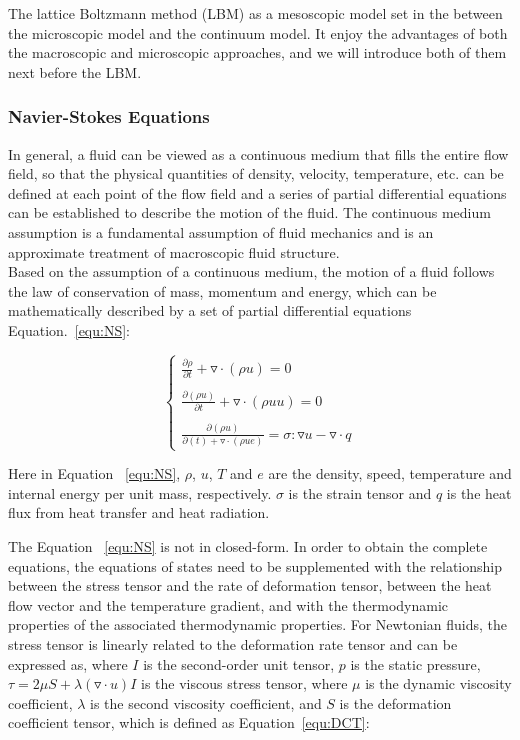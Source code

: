 The lattice Boltzmann method (LBM) as a mesoscopic model set in the between the microscopic model and the continuum model. It enjoy the advantages of both the macroscopic and microscopic approaches, and we will introduce both of them next before the LBM.

\subsubsection{Navier-Stokes Equations} \label{sec:nse}
In general, a fluid can be viewed as a continuous medium that fills the entire flow field, so that the physical quantities of density, velocity, temperature, etc. can be defined at each point of the flow field and a series of partial differential equations can be established to describe the motion of the fluid. The continuous medium assumption is a fundamental assumption of fluid mechanics and is an approximate treatment of macroscopic fluid structure.\\

Based on the assumption of a continuous medium, the motion of a fluid follows the law of conservation of mass, momentum and energy, which can be mathematically described by a set of partial differential equations Equation.~\ref{equ:NS}:

\begin{equation}
    \left\{\begin{matrix}
\frac{\partial \rho}{\partial t} + \triangledown \cdot (\rho u) = 0\\ 
\\
\frac{\partial (\rho u)}{\partial t} + \triangledown \cdot (\rho u u) = 0\\ 
\\
\frac{\partial (\rho u)}{\partial (t) + \triangledown \cdot (\rho u e)} = \sigma : \triangledown u - \triangledown \cdot q
\end{matrix}\right.
\label{equ:NS}
\end{equation}

Here in Equation ~\ref{equ:NS}, $\rho$, $u$, $T$ and $e$ are the density, speed, temperature and internal energy per unit mass, respectively. $\sigma$ is the strain tensor and $q$ is the heat flux from heat transfer and heat radiation.

The Equation ~\ref{equ:NS} is not in closed-form. In order to obtain the complete equations, the equations of states need to be supplemented with the relationship between the stress tensor and the rate of deformation tensor, between the heat flow vector and the temperature gradient, and with the thermodynamic properties of the associated thermodynamic properties. For Newtonian fluids, the stress tensor is linearly related to the deformation rate tensor and can be expressed as, where $I$ is the second-order unit tensor, $p$ is the static pressure, $\tau = 2 \mu S + \lambda(\triangledown \cdot u)I$ is the viscous stress tensor, where $\mu$ is the dynamic viscosity coefficient, $\lambda$ is the second viscosity coefficient, and $S$ is the deformation coefficient tensor, which is defined as Equation~\ref{equ:DCT}:

